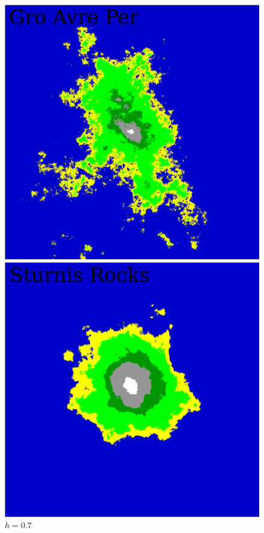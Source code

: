 \documentclass{article}
\begin{document}
\begin{figure}
  \centering
  \parbox[t]{0.33\textwidth}{%
    \includegraphics[width=0.9\linewidth]{kaart1.png}%
    \caption{$h=0.45$\cite{kaart}}%
    \label{fig:kaart1}}%
  \parbox[t]{0.33\textwidth}{%
    \includegraphics[width=0.9\linewidth]{kaart2.png}%
    \caption{$h=0.7$\cite{kaart}}%
    \label{fig:kaart2}}%
  \parbox[t]{0.33\textwidth}{%
}
\end{figure}
\end{document}

